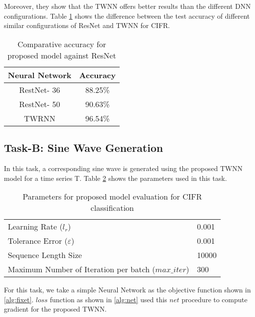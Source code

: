 \documentclass{article}
\begin{document}
Moreover, they show that the TWNN offers better results than the different DNN configurations. Table \ref{tab:result} shows the difference between the test accuracy of different similar configurations of ResNet and TWNN for CIFR.

\begin{table}[]
    \centering
    \caption{Comparative accuracy for proposed model against ResNet }
    \begin{tabular}{c|c}
        Neural Network & Accuracy \\
        \toprule
        RestNet- 36 & 88.25\% \\
        RestNet- 50 & 90.63\% \\
        TWRNN & 96.54\% \\
        \bottomrule
    \end{tabular}
    
    \label{tab:result}
\end{table}

\subsection{Task-B: Sine Wave Generation}
In this task, a corresponding sine wave is generated using the proposed TWNN model for a time series T.  Table \ref{tab:parameters-taskb} shows the parameters used in this task.
\begin{table}[ht!]
	\centering
	\caption{Parameters for proposed model evaluation for CIFR classification}
	\label{tab:parameters-taskb}

	\begin{tabular}{ll}
		\toprule
		Learning Rate ($l_{r}$)& 0.001 \\
		Tolerance Error ($\varepsilon$)& 0.001  \\
		Sequence Length Size &10000  \\
		Maximum Number of Iteration per batch ($max\_iter$)& 300  \\

	\end{tabular}
\end{table}

For this task, we take a simple Neural Network as the objective function shown in \ref{alg:fixet}. $loss$ function as shown in \ref{alg:net} used this $net$ procedure to compute gradient for the proposed TWNN.
\end{document}
